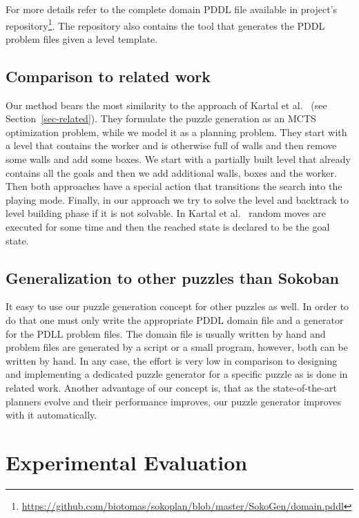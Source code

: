 \documentclass[runningheads]{llncs}
\begin{document}
For more details refer to the complete domain PDDL file available in project's 
repository\footnote{\url{https://github.com/biotomas/sokoplan/blob/master/SokoGen/domain.pddl}}.
The repository also contains the tool that generates the PDDL problem files given a level template.


\subsection{Comparison to related work}
Our method bears the most similarity to the approach of Kartal et al.~\cite{kartal2016data} (see Section~\ref{sec-related}).
They formulate the puzzle generation as an MCTS optimization problem, while we model it as a planning
problem. They start with a level that contains the worker and is otherwise full of walls and then remove some
walls and add some boxes. We start with
a partially built level that already contains all the goals and then we add additional walls, boxes and the worker.
Then both approaches have a special action that transitions the search into the playing mode.
Finally, in our approach we try to solve the level and backtrack to level building phase if it is not solvable.
In Kartal et al.~\cite{kartal2016data} random moves are executed for some time and then the reached state is
declared to be the goal state.

\subsection{Generalization to other puzzles than Sokoban}
It easy to use our puzzle generation concept for other puzzles as well. In order to
do that one must only write the appropriate PDDL domain file and a generator for the PDLL problem files. 
The domain file is usually written by hand and problem files are generated by a script or a small program,
however, both can be written by hand. In any case, the effort is very low in comparison to designing and
implementing a dedicated puzzle generator for a specific puzzle as is done in related work.
Another advantage of our concept is, that as the state-of-the-art planners evolve and their performance
improves, our puzzle generator improves with it automatically.

\section{Experimental Evaluation}
\end{document}
